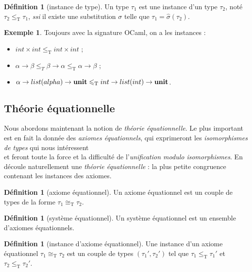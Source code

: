 \documentclass[a4paper]{report}
\theoremstyle{definition}
\newtheorem{definition}[theoreme]{Définition}
\newtheorem{exemple}[theoreme]{Exemple}
\newcommand{\ssi}{\textit{ssi}\xspace}
\newcommand{\unit}{\bold{unit}}
\newcommand{\T}{\mathrm{T}}
\newcommand\laure[1]{{\bf\color{WildStrawberry}{TODO: #1}}\\}
\begin{document}
\begin{definition}[instance de type]
  Un type $\tau_1$ est une instance d'un type $\tau_2$, noté $\tau_2 \leqslant_\T \tau_1$, \ssi il existe une substitution $\sigma$ telle que $\tau_1 = \hat\sigma (\tau_2)$.
\end{definition}

\begin{exemple}
  Toujours avec la signature OCaml, on a les instances :
  \begin{itemize}
    \item $int \times int \leqslant_\T int \times int$ ;
    \item $\alpha \rightarrow \beta \leqslant_T \beta \rightarrow \alpha \leqslant_\T \alpha \rightarrow \beta$ ;
    \item $\alpha \rightarrow list (alpha) \rightarrow \unit \leqslant_\T int \rightarrow list (int) \rightarrow \unit$.
  \end{itemize}
\end{exemple}


\subsection{Théorie équationnelle}

Nous abordons maintenant la notion de \emph{théorie équationnelle}. Le plus important est en fait la donnée des \emph{axiomes équationnels}, qui exprimeront les \emph{isomorphismes de types} qui nous intéressent \laure{car.... donner une intuition} et feront toute la force et la difficulté de l'\emph{unification modulo isomorphismes}. En découle naturellement une \emph{théorie équationnelle} : la plus petite congruence contenant les instances des axiomes.

\begin{definition}[axiome équationnel]
  Un axiome équationnel est un couple de types de la forme $\tau_1 \cong_\T \tau_2$.
\end{definition}

\begin{definition}[système équationnel]
  Un système équationnel est un ensemble d'axiomes équationnels.
\end{definition}

\begin{definition}[instance d'axiome équationnel]
  Une instance d'un axiome équationnel $\tau_1 \cong_\T \tau_2$ est un couple de types $(\tau_1', \tau_2')$ tel que $\tau_1 \leqslant_\T \tau_1'$ et $\tau_2 \leqslant_\T \tau_2'$.
\end{definition}
\end{document}
